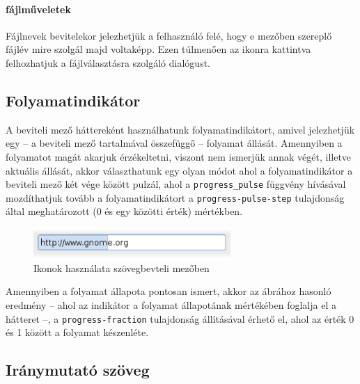 \paragraph{fájlműveletek} Fájlnevek bevitelekor jelezhetjük a felhasználó felé, hogy e mezőben szereplő fájlév mire szolgál majd voltaképp. Ezen túlmenően az ikonra kattintva felhozhatjuk a fájlválasztásra szolgáló dialógust.

\subsection{Folyamatindikátor}

A beviteli mező háttereként használhatunk folyamatindikátort, amivel jelezhetjük egy --  a beviteli mező tartalmával összefüggő -- folyamat állását. Amennyiben a folyamatot magát akarjuk érzékeltetni, viszont nem ismerjük annak végét, illetve aktuális állását, akkor választhatunk egy olyan módot ahol a folyamatindikátor a beviteli mező két vége között pulzál, ahol a \texttt{progress\_pulse} függvény hívásával mozdíthatjuk tovább a folyamatindikátort a \texttt{progress-pulse-step} tulajdonság által meghatározott (0 és egy közötti érték) mértékben.

\begin{figure}[h]
\begin{center}
\includegraphics[width=75mm]{images/entry-with-progressbar.png}
\caption{Ikonok használata szövegbevteli mezőben}
\end{center}
\end{figure}

Amennyiben a folyamat állapota pontosan ismert, akkor az ábrához hasonló eredmény -- ahol az indikátor a folyamat állapotának mértékében foglalja el a hátteret --, a \texttt{progress-fraction} tulajdonság állításával érhető el, ahol az érték 0 és 1 között a folyamat készenléte.

\subsection{Iránymutató szöveg}

